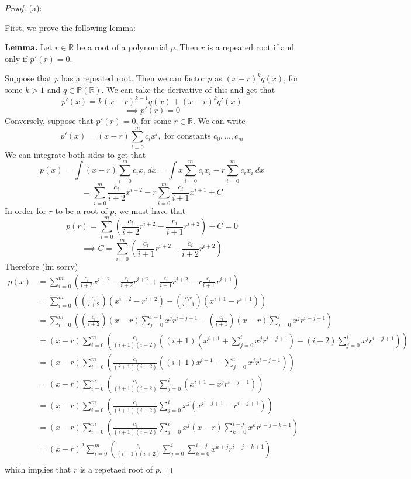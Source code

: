 \documentclass{article}
\theoremstyle{plain} %
\numberwithin{thm}{section} %
\theoremstyle{definition}
\begin{document}
        \begin{proof}
            (a):

    First, we prove the following lemma:

    \textbf{Lemma.} Let \(r \in \mathbb{R}\) be a root of a polynomial \(p\). Then \(r\) is a repeated root if and only if \(p'(r) = 0\).

    Suppose that \(p\) has a repeated root. Then we can factor \(p\) as \((x - r)^k q(x)\), for some \(k > 1\) and \(q \in \mathbb{P} (\mathbb{R})\). We can take the derivative of this and get that
    \[
        p'(x) = k(x - r)^{k-1} q(x) + (x - r)^k q'(x)
    \]
    \[
        \implies p'(r) = 0
    \]
    Conversely, suppose that \(p'(r) = 0\), for some \(r \in \mathbb{R}\). We can write
    \[
        p'(x) = (x - r)\sum_{i=0}^{m} c_i x^i, \text{ for constants } c_0, ..., c_m
    \]
    We can integrate both sides to get that
    \[
        p(x) = \int (x - r) \sum_{i=0}^{m} c_i x_i\ dx = \int x\sum_{i=0}^{m} c_i x_i - r\sum_{i=0}^{m} c_i x_i\ dx
    \]
    \[
        = \sum_{i=0}^{m} \frac{c_i}{i+2}x^{i+2} - r \sum_{i=0}^{m} \frac{c_i}{i+1}x^{i+1} + C
    \]
    In order for \(r\) to be a root of \(p\), we must have that
    \[
        p(r) = \sum_{i=0}^{m} \left(\frac{c_i}{i+2}r^{i+2} - \frac{c_i}{i+1}r^{i+2}\right) + C = 0
    \]
    \[
        \implies C = \sum_{i=0}^{m} \left(\frac{c_i}{i+1}r^{i+2} - \frac{c_i}{i+2}r^{i+2}\right)
    \]
    Therefore (im sorry)
    \begin{align*}
        p(x) &= \sum_{i=0}^{m} \left( \frac{c_i}{i+2}x^{i+2} - \frac{c_i}{i + 2}r^{i+2} + \frac{c_i}{i+1}r^{i+2} - r\frac{c_i}{i + 1}x^{i+1} \right) \\
        &= \sum_{i=0}^{m} \left( \left( \frac{c_i}{i+2} \right)(x^{i+2} - r^{i+2}) - \left( \frac{c_i r}{i + 1} \right)(x^{i+1} - r^{i+1})\right) \\
        &= \sum_{i=0}^{m} \left( \left( \frac{c_i}{i + 2} \right)(x - r) \sum_{j=0}^{i+1} x^j r^{i - j + 1} - \left( \frac{c_i}{i + 1} \right)(x - r)\sum_{j=0}^{i} x^j r^{i-j+1} \right) \\
        &= (x - r)\sum_{i=0}^{m} \left( \frac{c_i}{(i+1)(i+2)} \left( (i + 1)\left(x^{i+1} + \sum_{j=0}^{i} x^j r^{i-j+1} \right) - (i + 2)\sum_{j=0}^{i} x^j r^{i-j+1} \right) \right) \\
        &= (x - r)\sum_{i=0}^{m} \left( \frac{c_i}{(i+1)(i+2)}\left( (i+1)x^{i+1} - \sum_{j=0}^{i}x^j r^{i-j+1} \right) \right) \\
        &= (x-r)\sum_{i=0}^{m} \left( \frac{c_i}{(i+1)(i+2)} \sum_{j=0}^{i} (x^{i+1} - x^j r^{i-j+1})\right) \\
        &= (x-r)\sum_{i=0}^{m} \left( \frac{c_i}{(i+1)(i+2)} \sum_{j=0}^{i} x^j (x^{i-j+1} - r^{i-j+1})\right) \\
        &= (x-r)\sum_{i=0}^{m} \left( \frac{c_i}{(i+1)(i+2)} \sum_{j=0}^{i} x^j (x-r)\sum_{k=0}^{i-j} x^k r^{i-j-k+1}\right) \\
        &= (x-r)^2\sum_{i=0}^{m} \left( \frac{c_i}{(i+1)(i+2)} \sum_{j=0}^{i} \sum_{k=0}^{i-j} x^{k+j} r^{i-j-k+1}\right) \\
    \end{align*}
    which implies that \(r\) is a repetaed root of \(p\).


\end{proof}
\end{document}

